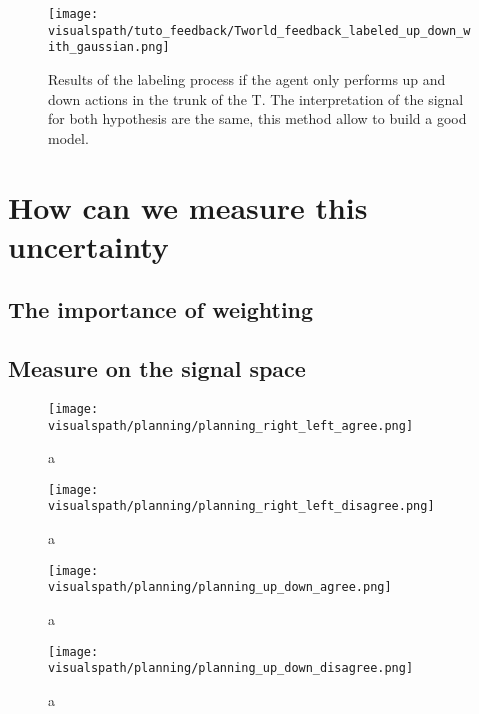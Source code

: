 \begin{figure}[!ht]
  \centering
  \texttt{[image: \\visualspath/tuto\_feedback/Tworld\_feedback\_labeled\_up\_down\_with\_gaussian.png]}
  \caption{Results of the labeling process if the agent only performs up and down actions in the trunk of the T. The interpretation of the signal for both hypothesis are the same, this method allow to build a good model.}
  \label{fig:planningupdown}
\end{figure}


\section{How can we measure this uncertainty}

\subsection{The importance of weighting}

\subsection{Measure on the signal space}

\begin{figure}[!ht]
  \centering
  \texttt{[image: \\visualspath/planning/planning\_right\_left\_agree.png]}
  \caption{a}
  \label{fig:uncertaintysignalrightleftagree}
\end{figure}


\begin{figure}[!ht]
  \centering
  \texttt{[image: \\visualspath/planning/planning\_right\_left\_disagree.png]}
  \caption{a}
  \label{fig:uncertaintysignalrightleftdisagree}
\end{figure}


\begin{figure}[!ht]
  \centering
  \texttt{[image: \\visualspath/planning/planning\_up\_down\_agree.png]}
  \caption{a}
  \label{fig:uncertaintysignalupdownagree}
\end{figure}


\begin{figure}[!ht]
  \centering
  \texttt{[image: \\visualspath/planning/planning\_up\_down\_disagree.png]}
  \caption{a}
  \label{fig:uncertaintysignalupdowndisagree}
\end{figure}

